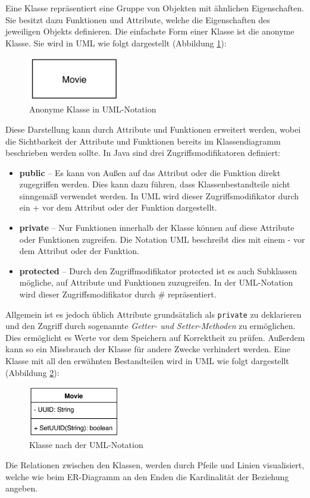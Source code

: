 		Eine Klasse repräsentiert eine Gruppe von Objekten mit ähnlichen Eigenschaften. Sie besitzt dazu Funktionen und Attribute, welche die Eigenschaften des jeweiligen Objekts definieren. Die einfachste Form einer Klasse ist die anonyme Klasse. Sie wird in UML wie folgt dargestellt (Abbildung \ref{fig:uml_anonym_class}):
		\begin{figure}[H]
			\centering 
			\includegraphics[width=4cm]{img/uml_anonym_class.JPG}
			\captionsetup{format=hang}
			\caption[Anonyme Klasse in UML-Notation]{\label{fig:uml_anonym_class}Anonyme Klasse in UML-Notation}
		\end{figure}
		Diese Darstellung kann durch Attribute und Funktionen erweitert werden, wobei die Sichtbarkeit der Attribute und Funktionen bereits im Klassendiagramm beschrieben werden sollte. In Java sind drei Zugriffsmodifikatoren definiert:
		\begin{itemize}
			\item\textbf{public} -- Es kann von Außen auf das Attribut oder die Funktion direkt zugegriffen werden. Dies kann dazu führen, dass Klassenbestandteile nicht sinngemäß verwendet werden. In UML wird dieser Zugriffsmodifikator durch ein + vor dem Attribut oder der Funktion dargestellt. 
			\item\textbf{private} -- Nur Funktionen innerhalb der Klasse können auf diese Attribute oder Funktionen zugreifen. Die Notation UML beschreibt dies mit einem - vor dem Attribut oder der Funktion.
			\item\textbf{protected} -- Durch den Zugriffmodifikator protected ist es auch Subklassen mögliche, auf Attribute und Funktionen zuzugreifen. In der UML-Notation wird dieser Zugriffsmodifikator durch \# repräsentiert.
		\end{itemize}
		Allgemein ist es jedoch üblich Attribute grundsätzlich als \texttt{private} zu deklarieren und den Zugriff durch sogenannte \textit{Getter- und Setter-Methoden} zu ermöglichen. Dies ermöglicht es Werte vor dem Speichern auf Korrektheit zu prüfen. Außerdem kann so ein Missbrauch der Klasse für andere Zwecke verhindert werden. Eine Klasse mit all den erwähnten Bestandteilen wird in UML wie folgt dargestellt (Abbildung \ref{fig:KlasseUML}): 
		\begin{figure}[H]
			\centering 
			\includegraphics[width=4cm]{img/uml_class.JPG}
			\captionsetup{format=hang}
			\caption[Klasse in UML-Notation]{\label{fig:KlasseUML}Klasse nach der UML-Notation}
		\end{figure}
		Die Relationen zwischen den Klassen, werden durch Pfeile und Linien visualisiert, welche wie beim ER-Diagramm an den Enden die Kardinalität der Beziehung angeben. 
		
